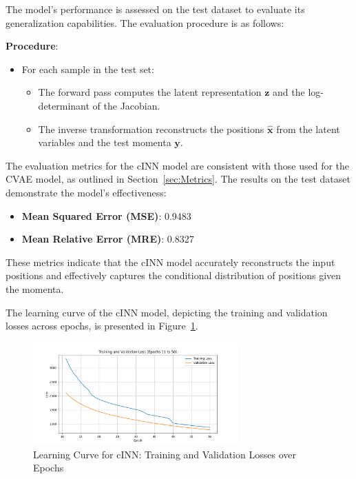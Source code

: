 \documentclass[11pt]{paper}
\begin{document}
The model's performance is assessed on the test dataset to evaluate its generalization capabilities. The evaluation procedure is as follows:

\textbf{Procedure}:
\begin{itemize}
    \item For each sample in the test set:
    \begin{itemize}
        \item The forward pass computes the latent representation $\mathbf{z}$ and the log-determinant of the Jacobian.
        \item The inverse transformation reconstructs the positions $\mathbf{\hat{x}}$ from the latent variables and the test momenta $\mathbf{y}$.
    \end{itemize}
\end{itemize}

The evaluation metrics for the cINN model are consistent with those used for the CVAE model, as outlined in Section~\ref{sec:Metrics}. The results on the test dataset demonstrate the model's effectiveness:

\begin{itemize}
    \item \textbf{Mean Squared Error (MSE)}: 0.9483
    \item \textbf{Mean Relative Error (MRE)}: 0.8327
\end{itemize}

These metrics indicate that the cINN model accurately reconstructs the input positions and effectively captures the conditional distribution of positions given the momenta.

The learning curve of the cINN model, depicting the training and validation losses across epochs, is presented in Figure~\ref{fig:cinn_lc}.

\begin{figure}[H]
    \centering
    \includegraphics[width=0.7\textwidth]{cinn-lc.png}
    \caption{Learning Curve for cINN: Training and Validation Losses over Epochs}
    \label{fig:cinn_lc}
\end{figure}
\end{document}

